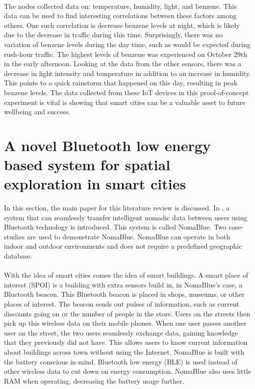 \documentclass[a4paper,12pt]{article}
\begin{document}
\paragraph{}
The nodes collected data on: temperature, humidity, light, and benzene. This data can be used to find interesting correlations between these factors among others. One such correlation is decrease benzene levels at night, which is likely due to the decrease in traffic during this time. Surprisingly, there was no variation of benzene levels during the day time, such as would be expected during rush-hour traffic. The highest levels of benzene was experienced on October 29th in the early afternoon. Looking at the data from the other sensors, there was a decrease in light intensity and temperature in addition to an increase in humidity. This points to a quick rainstorm that happened on this day, resulting in peak benzene levels. The data collected from these IoT devices in this proof-of-concept experiment is vital is showing that smart cities can be a valuable asset to future wellbeing and success.

\section*{A novel Bluetooth low energy based system for spatial exploration in smart cities}
\paragraph{}
In this section, the main paper for this literature review is discussed. In \cite{SC}, a system that can seamlessly transfer intelligent nomadic data between users using Bluetooth technology is introduced. This system is called NomaBlue. Two case-studies are used to demonstrate NomaBlue. NomaBlue can operate in both indoor and outdoor environments and does not require a predefined geographic database.
\paragraph{}
With the idea of smart cities comes the idea of smart buildings. A smart place of interest (SPOI) is a building with extra sensors build in, in NomaBlue's case, a Bluetooth beacon. This Bluetooth beacon is placed in shops, museums, or other places of interest. The beacon sends out pulses of information, such as current discounts going on or the number of people in the store. Users on the streets then pick up this wireless data on their mobile phones. When one user passes another user on the street, the two users seamlessly exchange data, gaining knowledge that they previously did not have. This allows users to know current information about buildings across town without using the Internet. NomaBlue is built with the battery conscious in-mind. Bluetooth low energy (BLE) is used instead of other wireless data to cut down on energy consumption. NomaBlue also uses little RAM when operating, decreasing the battery usage further.
\end{document}

